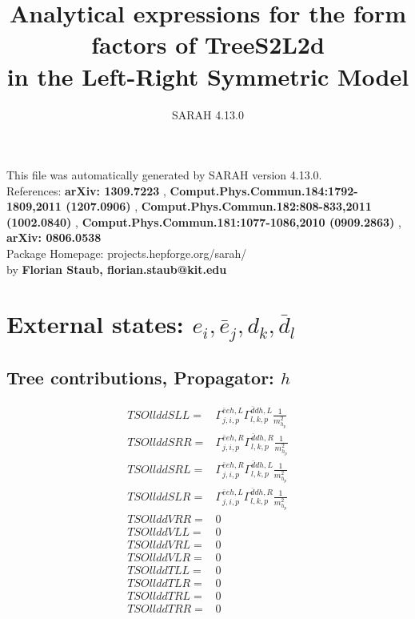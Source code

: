 \documentclass[A4,landscape]{article}
\begin{document}
\title{Analytical expressions for the form factors of TreeS2L2d\\ in the Left-Right Symmetric Model } 
 \author{SARAH 4.13.0} 
 \maketitle 
 \vspace{10cm} 
This file was automatically generated by SARAH version 4.13.0.  \\ 
References: {\bf arXiv: 1309.7223 }, {\bf Comput.Phys.Commun.184:1792-1809,2011 (1207.0906) }, {\bf Comput.Phys.Commun.182:808-833,2011 (1002.0840) }, {\bf Comput.Phys.Commun.181:1077-1086,2010 (0909.2863) }, {\bf arXiv: 0806.0538 } \\ 
Package Homepage: projects.hepforge.org/sarah/ \\ 
by {\bf Florian Staub, florian.staub@kit.edu} 
 \pagebreak 
 \tableofcontents 
 \pagebreak 
\section{External states: ${e_{{i}}, \bar{e}_{{j}}, d_{{k}}, \bar{d}_{{l}}}$} 
\subsection{Tree contributions, Propagator: $h$} 

\begin{align} 
  TSOllddSLL= & \Gamma^{\bar{e}e h ,L}_{j, i, p} \Gamma^{\bar{d}d h ,L}_{l, k, p} \frac{1}{m^2_{h_{{p}}}} \\ 
  TSOllddSRR= & \Gamma^{\bar{e}e h ,R}_{j, i, p} \Gamma^{\bar{d}d h ,R}_{l, k, p} \frac{1}{m^2_{h_{{p}}}} \\ 
  TSOllddSRL= & \Gamma^{\bar{e}e h ,R}_{j, i, p} \Gamma^{\bar{d}d h ,L}_{l, k, p} \frac{1}{m^2_{h_{{p}}}} \\ 
  TSOllddSLR= & \Gamma^{\bar{e}e h ,L}_{j, i, p} \Gamma^{\bar{d}d h ,R}_{l, k, p} \frac{1}{m^2_{h_{{p}}}} \\ 
  TSOllddVRR= & 0 \\ 
  TSOllddVLL= & 0 \\ 
  TSOllddVRL= & 0 \\ 
  TSOllddVLR= & 0 \\ 
  TSOllddTLL= & 0 \\ 
  TSOllddTLR= & 0 \\ 
  TSOllddTRL= & 0 \\ 
  TSOllddTRR= & 0 \\ 
\end{align} 
\end{document}
